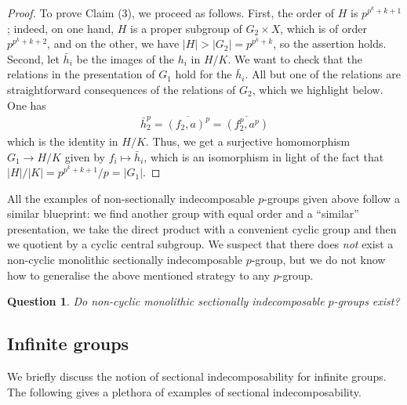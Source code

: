 \documentclass[a4paper,10pt]{amsart}
\theoremstyle{plain}
\newtheorem{question}[thm]{Question}
\theoremstyle{definition}
\begin{document}
\begin{proof}
    To prove Claim (3), we proceed as follows. First, the order of $H$ is $p^{p^k+k+1}$; indeed, on one hand, $H$ is a proper subgroup of $G_2 \times X$, which is of order $p^{p^k+k+2}$, and on the other, we have $|H| > |G_2|=p^{p^k+k}$, so the assertion holds. Second, let $\bar{h}_i$ be the images of the $h_i$ in $H/K$. We want to check that the relations in the presentation of $G_1$ hold for the $\bar{h}_i$. All but one of the relations are straightforward consequences of the relations of $G_2$, which we highlight below. One has
    \begin{align*}
        \bar{h}_2^p=\overline{(f_2,a)^p}=\overline{(f_2^p,a^p)}
    \end{align*}
  which is the identity in $H/K$. Thus, we get a surjective homomorphism $G_1 \to H/K$ given by $f_i \mapsto \bar{h}_i$, which is an isomorphism in light of the fact that $|H|/|K|= p^{p^k+k+1}/p = |G_1|$.
\end{proof}

All the examples of non-sectionally indecomposable $p$-groups given above follow a similar blueprint: we find another group with equal order and a ``similar'' presentation, we take the direct product with a convenient cyclic group and then we quotient by a cyclic central subgroup. We suspect that there does \emph{not} exist a non-cyclic monolithic sectionally indecomposable $p$-group, but we do not know how to generalise the above mentioned strategy to any $p$-group.

\begin{question}\label{q:p-groups}
    Do non-cyclic monolithic sectionally indecomposable $p$-groups exist?
\end{question}

\subsection{Infinite groups}

We briefly discuss the notion of sectional indecomposability for infinite groups. The following gives a plethora of examples of sectional indecomposability.
\end{document}
